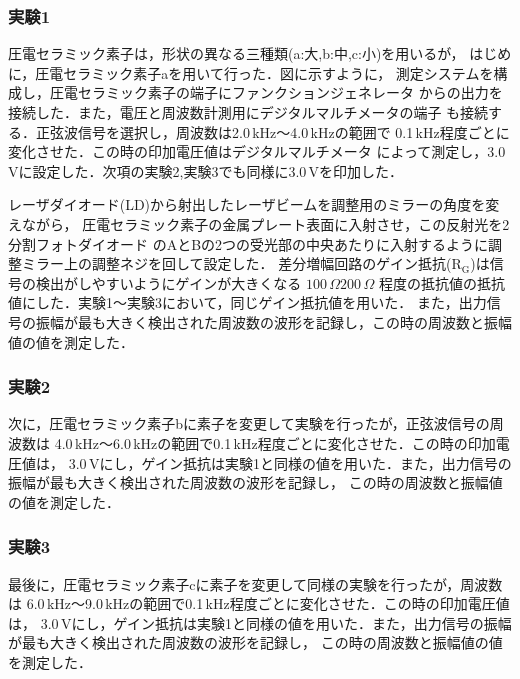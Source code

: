 \documentclass{ltjsarticle}
\begin{document}
		\subsubsection{実験1}
			圧電セラミック素子は，形状の異なる三種類(a:大,b:中,c:小)を用いるが，
			はじめに，圧電セラミック素子aを用いて行った．図に示すように，
			測定システムを構成し，圧電セラミック素子の端子にファンクションジェネレータ
			からの出力を接続した．また，電圧と周波数計測用にデジタルマルチメータの端子
			も接続する．正弦波信号を選択し，周波数は2.0\,kHz～4.0\,kHzの範囲で
			0.1\,kHz程度ごとに変化させた．この時の印加電圧値はデジタルマルチメータ
			によって測定し，3.0\,Vに設定した．次項の実験2,実験3でも同様に3.0\,Vを印加した．

			レーザダイオード(LD)から射出したレーザビームを調整用のミラーの角度を変えながら，
			圧電セラミック素子の金属プレート表面に入射させ，この反射光を2分割フォトダイオード
			のAとBの2つの受光部の中央あたりに入射するように調整ミラー上の調整ネジを回して設定した．
			差分増幅回路のゲイン抵抗($\mathrm{R_G}$)は信号の検出がしやすいようにゲインが大きくなる
			$100\,\Omega 200\,\Omega$ 程度の抵抗値の抵抗値にした．実験1～実験3において，同じゲイン抵抗値を用いた．
			また，出力信号の振幅が最も大きく検出された周波数の波形を記録し，この時の周波数と振幅値の値を測定した．

		\subsubsection{実験2}
			次に，圧電セラミック素子bに素子を変更して実験を行ったが，正弦波信号の周波数は
			4.0\,kHz～6.0\,kHzの範囲で0.1\,kHz程度ごとに変化させた．この時の印加電圧値は，
			3.0\,Vにし，ゲイン抵抗は実験1と同様の値を用いた．また，出力信号の振幅が最も大きく検出された周波数の波形を記録し，
			この時の周波数と振幅値の値を測定した．

		\subsubsection{実験3}
			最後に，圧電セラミック素子cに素子を変更して同様の実験を行ったが，周波数は
			6.0\,kHz～9.0\,kHzの範囲で0.1\,kHz程度ごとに変化させた．この時の印加電圧値は，
			3.0\,Vにし，ゲイン抵抗は実験1と同様の値を用いた．また，出力信号の振幅が最も大きく検出された周波数の波形を記録し，
			この時の周波数と振幅値の値を測定した．
\end{document}
